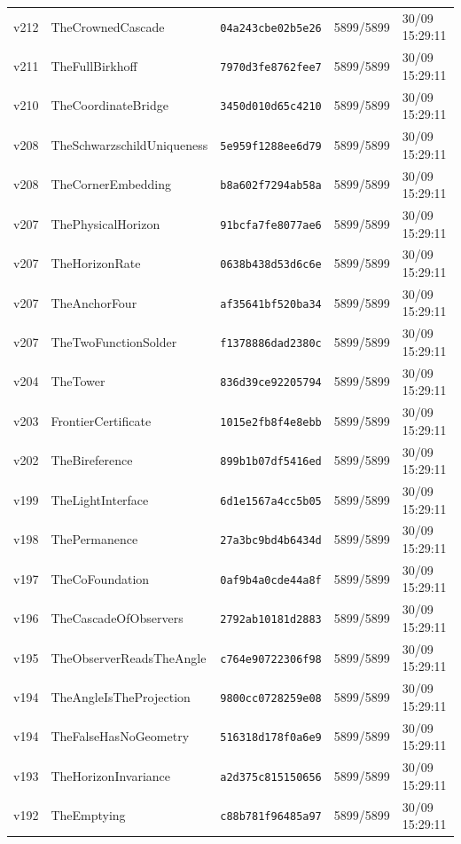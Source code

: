 \documentclass[11pt]{article}
\theoremstyle{definition}\newtheorem{deriv}{Derivation}
\begin{document}
{\begin{longtable}{@{}lllll@{}}
v212 & TheCrownedCascade & \texttt{04a243cbe02b5e26} & 5899/5899 & 30/09 15:29:11 \\
v211 & TheFullBirkhoff & \texttt{7970d3fe8762fee7} & 5899/5899 & 30/09 15:29:11 \\
v210 & TheCoordinateBridge & \texttt{3450d010d65c4210} & 5899/5899 & 30/09 15:29:11 \\
v208 & TheSchwarzschildUniqueness & \texttt{5e959f1288ee6d79} & 5899/5899 & 30/09 15:29:11 \\
v208 & TheCornerEmbedding & \texttt{b8a602f7294ab58a} & 5899/5899 & 30/09 15:29:11 \\
v207 & ThePhysicalHorizon & \texttt{91bcfa7fe8077ae6} & 5899/5899 & 30/09 15:29:11 \\
v207 & TheHorizonRate & \texttt{0638b438d53d6c6e} & 5899/5899 & 30/09 15:29:11 \\
v207 & TheAnchorFour & \texttt{af35641bf520ba34} & 5899/5899 & 30/09 15:29:11 \\
v207 & TheTwoFunctionSolder & \texttt{f1378886dad2380c} & 5899/5899 & 30/09 15:29:11 \\
v204 & TheTower & \texttt{836d39ce92205794} & 5899/5899 & 30/09 15:29:11 \\
v203 & FrontierCertificate & \texttt{1015e2fb8f4e8ebb} & 5899/5899 & 30/09 15:29:11 \\
v202 & TheBireference & \texttt{899b1b07df5416ed} & 5899/5899 & 30/09 15:29:11 \\
v199 & TheLightInterface & \texttt{6d1e1567a4cc5b05} & 5899/5899 & 30/09 15:29:11 \\
v198 & ThePermanence & \texttt{27a3bc9bd4b6434d} & 5899/5899 & 30/09 15:29:11 \\
v197 & TheCoFoundation & \texttt{0af9b4a0cde44a8f} & 5899/5899 & 30/09 15:29:11 \\
v196 & TheCascadeOfObservers & \texttt{2792ab10181d2883} & 5899/5899 & 30/09 15:29:11 \\
v195 & TheObserverReadsTheAngle & \texttt{c764e90722306f98} & 5899/5899 & 30/09 15:29:11 \\
v194 & TheAngleIsTheProjection & \texttt{9800cc0728259e08} & 5899/5899 & 30/09 15:29:11 \\
v194 & TheFalseHasNoGeometry & \texttt{516318d178f0a6e9} & 5899/5899 & 30/09 15:29:11 \\
v193 & TheHorizonInvariance & \texttt{a2d375c815150656} & 5899/5899 & 30/09 15:29:11 \\
v192 & TheEmptying & \texttt{c88b781f96485a97} & 5899/5899 & 30/09 15:29:11 \\

\end{longtable}}
\end{document}
